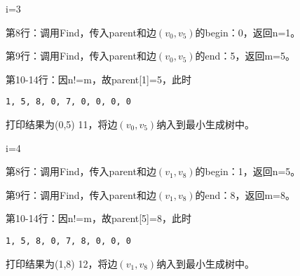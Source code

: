 \begin{frame}\ft{\subsubsecname}
\begin{figure}

\end{figure}
\end{frame}


\begin{frame}[fragile]\ft{\subsubsecname}
\tf i=3
\vspace{0.05in}

第8行：调用Find，传入parent和边$(v_0,v_5)$的begin：0，返回n=1。 \vspace{0.05in}

第9行：调用Find，传入parent和边$(v_0,v_5)$的end：5，返回m=5。 \vspace{0.05in}

第10-14行：因n!=m，故parent[1]=5，此时
\begin{lstlisting}[xleftmargin=2em]
1, 5, 8, 0, 7, 0, 0, 0, 0
\end{lstlisting}
打印结果为(0,5) 11，将边$(v_0,v_5)$纳入到最小生成树中。
\end{frame}

\begin{frame}\ft{\subsubsecname}
\begin{figure}

\end{figure}
\end{frame}



\begin{frame}[fragile]\ft{\subsubsecname}
\tf i=4
\vspace{0.05in}

第8行：调用Find，传入parent和边$(v_1,v_8)$的begin：1，返回n=5。 \vspace{0.05in}

第9行：调用Find，传入parent和边$(v_1,v_8)$的end：8，返回m=8。 \vspace{0.05in}

第10-14行：因n!=m，故parent[5]=8，此时
\begin{lstlisting}[xleftmargin=2em]
1, 5, 8, 0, 7, 8, 0, 0, 0
\end{lstlisting}
打印结果为(1,8) 12，将边$(v_1,v_8)$纳入到最小生成树中。
\end{frame}


